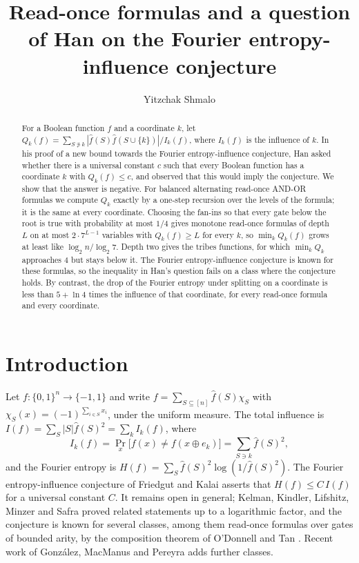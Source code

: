 \documentclass[11pt]{amsart}
\title[A question of Han on Fourier coefficients]{Read-once formulas and a question of Han on the Fourier
entropy-influence conjecture}
\author{Yitzchak Shmalo}
\theoremstyle{definition}\newtheorem{definition}[theorem]{Definition}
\theoremstyle{remark}\newtheorem{remark}[theorem]{Remark}
\newcommand{\hf}{\widehat{f}}
\begin{document}
\begin{abstract}
For a Boolean function $f$ and a coordinate $k$, let $Q_k(f)=\sum_{S\not\ni k}|\hf(S)\hf(S\cup\{k\})|/I_k(f)$,
where $I_k(f)$ is the influence of $k$. In his proof of a new bound towards the Fourier entropy-influence
conjecture, Han asked whether there is a universal constant $c$ such that every Boolean function has a coordinate
$k$ with $Q_k(f)\le c$, and observed that this would imply the conjecture. We show that the answer is negative. For
balanced alternating read-once AND-OR formulas we compute $Q_k$ exactly by a one-step recursion over the levels of
the formula; it is the same at every coordinate. Choosing the fan-ins so that every gate below the root is true with
probability at most $1/4$ gives monotone read-once formulas of depth $L$ on at most $2\cdot 7^{L-1}$ variables with
$Q_k(f)\ge L$ for every $k$, so $\min_k Q_k(f)$ grows at least like $\log_2 n/\log_2 7$. Depth two gives the tribes
functions, for which $\min_k Q_k$ approaches $4$ but stays below it. The Fourier entropy-influence conjecture is
known for these formulas, so the inequality in Han's question fails on a class where the conjecture holds. By
contrast, the drop of the Fourier entropy under splitting on a coordinate is less than $5+\ln 4$ times the
influence of that coordinate, for every read-once formula and every coordinate.
\end{abstract}
\maketitle

\section{Introduction}

Let $f\colon\{0,1\}^n\to\{-1,1\}$ and write $f=\sum_{S\subseteq[n]}\hf(S)\chi_S$ with $\chi_S(x)=(-1)^{\sum_{i\in S}x_i}$,
under the uniform measure. The total influence is $I(f)=\sum_S|S|\hf(S)^2=\sum_k I_k(f)$, where
\[
I_k(f)=\Pr_x\bigl[f(x)\ne f(x\oplus e_k)\bigr]=\sum_{S\ni k}\hf(S)^2 ,
\]
and the Fourier entropy is $H(f)=\sum_S\hf(S)^2\log(1/\hf(S)^2)$. The Fourier entropy-influence conjecture of
Friedgut and Kalai \cite{fk} asserts that $H(f)\le C\,I(f)$ for a universal constant $C$. It remains open in general;
Kelman, Kindler, Lifshitz, Minzer and Safra \cite{kklms} proved related statements up to a logarithmic factor, and
the conjecture is known for several classes, among them read-once formulas over gates of bounded arity, by the
composition theorem of O'Donnell and Tan \cite{ot}. Recent work of Gonz\'alez, MacManus and Pereyra \cite{gmp} adds
further classes.
\end{document}
